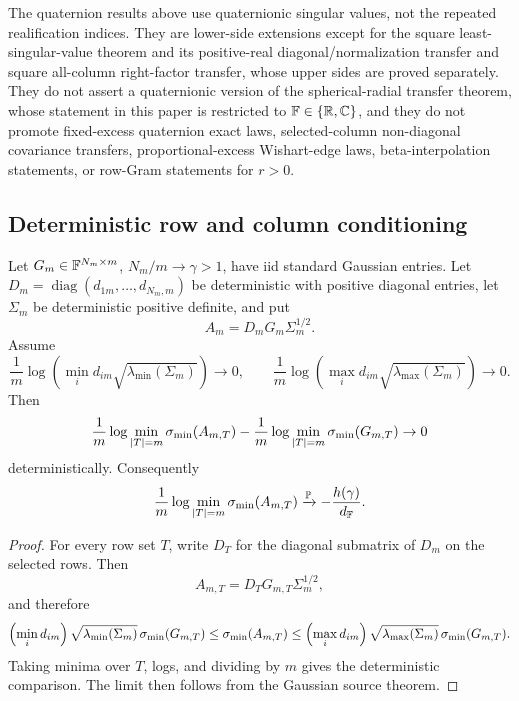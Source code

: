 \begin{remark}
The quaternion results above use quaternionic singular values, not the repeated
realification indices.  They are lower-side extensions except for the square
least-singular-value theorem and its positive-real diagonal/normalization
transfer and square all-column right-factor transfer, whose upper sides are
proved separately.  They do not assert a quaternionic version of the
spherical-radial transfer theorem, whose statement in this paper is restricted
to \(\mathbb{F}\in\{\mathbb{R},\mathbb{C}\}\), and they do not promote fixed-excess quaternion exact
laws, selected-column non-diagonal covariance transfers, proportional-excess
Wishart-edge laws, beta-interpolation statements, or row-Gram statements for
\(r>0\).
\end{remark}

\subsection{Deterministic row and column conditioning}

\begin{proposition}\label{prop:cov-transfer}
Let \(G_m\in\mathbb{F}^{N_m\times m}\), \(N_m/m\to\gamma>1\), have iid standard
Gaussian entries.  Let \(D_m=\operatorname{diag}(d_{1m},\dots,d_{N_m,m})\) be
deterministic with positive diagonal entries, let \(\Sigma_m\) be deterministic
positive definite, and put
\[
  A_m=D_mG_m\Sigma_m^{1/2}.
\]
Assume
\[
  \frac1m\log\!\left(\min_i d_{im}\sqrt{\lambda_{\min}(\Sigma_m)}\right)\to0,
  \qquad
  \frac1m\log\!\left(\max_i d_{im}\sqrt{\lambda_{\max}(\Sigma_m)}\right)\to0.
\]
Then
\[
  \frac{1}{m}\log\min_{|T|=m}\sigma_{\min}(A_{m,T})
  -
  \frac{1}{m}\log\min_{|T|=m}\sigma_{\min}(G_{m,T})
  \to0
\]
deterministically.  Consequently
\[
  \frac{1}{m}\log\min_{|T|=m}\sigma_{\min}(A_{m,T})
  \xrightarrow{\mathbb{P}}-\frac{h(\gamma)}{d_{\mathbb{F}}}.
\]
\end{proposition}

\begin{proof}
For every row set \(T\), write \(D_T\) for the diagonal submatrix of \(D_m\) on
the selected rows.  Then
\[
  A_{m,T}=D_TG_{m,T}\Sigma_m^{1/2},
\]
and therefore
\[
  \left(\min_i d_{im}\right)\sqrt{\lambda_{\min}(\Sigma_m)}\,\sigma_{\min}(G_{m,T})
  \le \sigma_{\min}(A_{m,T})
  \le
  \left(\max_i d_{im}\right)\sqrt{\lambda_{\max}(\Sigma_m)}\,\sigma_{\min}(G_{m,T}).
\]
Taking minima over \(T\), logs, and dividing by \(m\) gives the deterministic
comparison.  The limit then follows from the Gaussian source theorem.
\end{proof}

